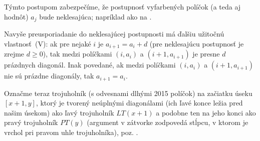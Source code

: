 {Týmto postupom zabezpečíme, že postupnosť vyfarbených políčok (a teda aj hodnôt) $a_j$ bude neklesajúca; napríklad ako na \obr{}.
%

Navyše preusporiadanie do neklesajúcej postupnosti má ďalšiu užitočnú vlastnosť~(V): ak pre nejaké $i$ je $a_{i+1}=a_i+d$ (pre neklesajúcu postupnosť je zrejme $d\ge 0$), tak medzi políčkami $(i,a_i)$ a $(i+1,a_{i+1})$ je presne $d$ prázdnych diagonál. Inak povedané, ak medzi políčkami $(i,a_i)$ a $(i+1,a_{i+1})$ nie sú prázdne diagonály, tak $a_{i+1}=a_i$.

Označme teraz trojuholník (s odvesnami dlhými 2015 políčok) na začiatku úseku $[x+1,y]$, ktorý je tvorený neúplnými diagonálami (ich ľavé konce ležia pred našim úsekom) ako ľavý trojuholník $LT(x+1)$ a podobne ten na jeho konci ako pravý trojuholník $PT(y)$ (argument v zátvorke zodpovedá stĺpcu, v ktorom je vrchol pri pravom uhle trojuholníka), poz. \obr{}.
%

}
